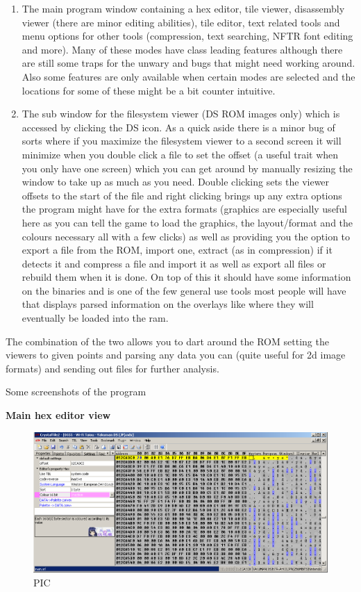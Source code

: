 \documentclass[
]{book}
\providecommand{\tightlist}{%
  \setlength{\itemsep}{0pt}\setlength{\parskip}{0pt}}
\begin{document}
\begin{enumerate}
\def\labelenumi{\arabic{enumi}.}
\tightlist
\item
  The main program window containing a hex editor, tile viewer, disassembly viewer (there are minor editing abilities), tile editor, text related tools and menu options for other tools (compression, text searching, NFTR font editing and more). Many of these modes have class leading features although there are still some traps for the unwary and bugs that might need working around. Also some features are only available when certain modes are selected and the locations for some of these might be a bit counter intuitive.
\item
  The sub window for the filesystem viewer (DS ROM images only) which is accessed by clicking the DS icon. As a quick aside there is a minor bug of sorts where if you maximize the filesystem viewer to a second screen it will minimize when you double click a file to set the offset (a useful trait when you only have one screen) which you can get around by manually resizing the window to take up as much as you need. Double clicking sets the viewer offsets to the start of the file and right clicking brings up any extra options the program might have for the extra formats (graphics are especially useful here as you can tell the game to load the graphics, the layout/format and the colours necessary all with a few clicks) as well as providing you the option to export a file from the ROM, import one, extract (as in compression) if it detects it and compress a file and import it as well as export all files or rebuild them when it is done. On top of this it should have some information on the binaries and is one of the few general use tools most people will have that displays parsed information on the overlays like where they will eventually be loaded into the ram.
\end{enumerate}

The combination of the two allows you to dart around the ROM setting the viewers to given points and parsing any data you can (quite useful for 2d image formats) and sending out files for further analysis.

Some screenshots of the program

\textbf{Main hex editor view}

\begin{figure}
\centering
\includegraphics{images/220_home_fast6191_romhackingguide_unrenamed_fil___inal_borders_romhackguidecrystaltile2usage1.png}
\caption{PIC}
\end{figure}
\end{document}
